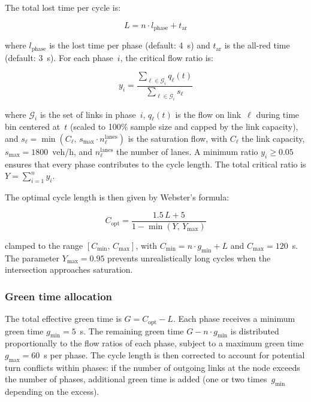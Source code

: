 The total lost time per cycle is:

\begin{equation}
    L = n \cdot l_{\text{phase}} + t_{\text{ar}}
    \label{eq:lost_time}
\end{equation}

\noindent where $l_{\text{phase}}$ is the lost time per phase (default: 4~s) and $t_{\text{ar}}$ is the all-red time (default: 3~s). For each phase~$i$, the critical flow ratio is:

\begin{equation}
    y_i = \frac{\sum_{\ell \in \mathcal{G}_i} q_\ell(t)}{\sum_{\ell \in \mathcal{G}_i} s_\ell}
    \label{eq:flow_ratio}
\end{equation}

\noindent where $\mathcal{G}_i$ is the set of links in phase~$i$, $q_\ell(t)$ is the flow on link~$\ell$ during time bin centered at~$t$ (scaled to 100\% sample size and capped by the link capacity), and $s_\ell = \min(C_\ell, \, s_{\max} \cdot n_\ell^{\text{lanes}})$ is the saturation flow, with $C_\ell$ the link capacity, $s_{\max} = 1800$~veh/h, and $n_\ell^{\text{lanes}}$ the number of lanes. A minimum ratio $y_i \geq 0.05$ ensures that every phase contributes to the cycle length. The total critical ratio is $Y = \sum_{i=1}^{n} y_i$.

The optimal cycle length is then given by Webster's formula:

\begin{equation}
    C_{\text{opt}} = \frac{1.5 \, L + 5}{1 - \min(Y, \, Y_{\max})}
    \label{eq:webster_copt}
\end{equation}

\noindent clamped to the range $[C_{\min}, \, C_{\max}]$, with $C_{\min} = n \cdot g_{\min} + L$ and $C_{\max} = 120$~s. The parameter $Y_{\max} = 0.95$ prevents unrealistically long cycles when the intersection approaches saturation.

\subsubsection{Green time allocation}

The total effective green time is $G = C_{\text{opt}} - L$. Each phase receives a minimum green time $g_{\min} = 5$~s. The remaining green time $G - n \cdot g_{\min}$ is distributed proportionally to the flow ratios of each phase, subject to a maximum green time $g_{\max} = 60$~s per phase. The cycle length is then corrected to account for potential turn conflicts within phases: if the number of outgoing links at the node exceeds the number of phases, additional green time is added (one or two times~$g_{\min}$ depending on the excess).

